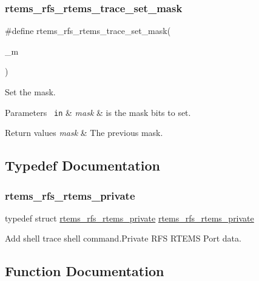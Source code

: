 \subsubsection{\texorpdfstring{rtems\_rfs\_rtems\_trace\_set\_mask}{rtems\_rfs\_rtems\_trace\_set\_mask}}
{\footnotesize\ttfamily \#define rtems\+\_\+rfs\+\_\+rtems\+\_\+trace\+\_\+set\+\_\+mask(\begin{DoxyParamCaption}\item[{}]{\+\_\+m }\end{DoxyParamCaption})}

Set the mask.


\begin{DoxyParams}[1]{Parameters}
\mbox{\texttt{ in}}  & {\em mask} & is the mask bits to set.\\
\hline
\end{DoxyParams}

\begin{DoxyRetVals}{Return values}
{\em mask} & The previous mask. \\
\hline
\end{DoxyRetVals}


\subsection{Typedef Documentation}
\mbox{\label{rtems-rfs-rtems_8h_aceaad4b4b8bccb8901ad1562f83835c8}} 
\subsubsection{\texorpdfstring{rtems\_rfs\_rtems\_private}{rtems\_rfs\_rtems\_private}}
{\footnotesize\ttfamily typedef struct \mbox{\hyperlink{structrtems__rfs__rtems__private}{rtems\+\_\+rfs\+\_\+rtems\+\_\+private}}  \mbox{\hyperlink{structrtems__rfs__rtems__private}{rtems\+\_\+rfs\+\_\+rtems\+\_\+private}}}

Add shell trace shell command.\+Private R\+FS R\+T\+E\+MS Port data. 

\subsection{Function Documentation}
\mbox{\label{rtems-rfs-rtems_8h_afea85d020da25d7bba8b14906c58a74a}} 
